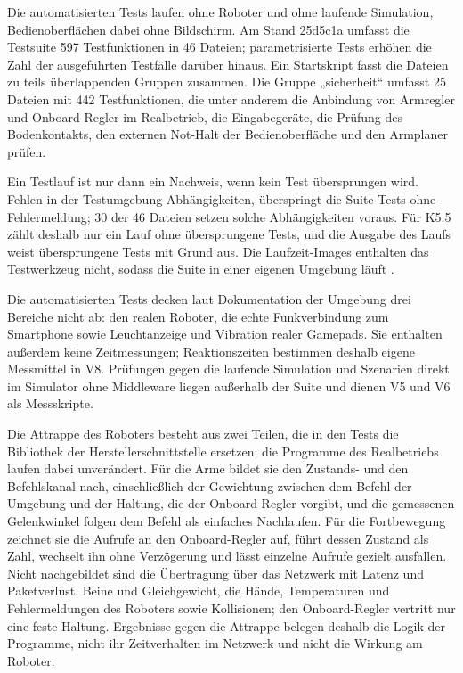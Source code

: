 Die automatisierten Tests laufen ohne Roboter und ohne laufende Simulation, Bedienoberflächen dabei ohne Bildschirm.
Am Stand 25d5c1a umfasst die Testsuite 597 Testfunktionen in 46 Dateien; parametrisierte Tests erhöhen die Zahl der ausgeführten Testfälle darüber hinaus.
Ein Startskript fasst die Dateien zu teils überlappenden Gruppen zusammen.
Die Gruppe „sicherheit“ umfasst 25 Dateien mit 442 Testfunktionen, die unter anderem die Anbindung von Armregler und Onboard-Regler im Realbetrieb, die Eingabegeräte, die Prüfung des Bodenkontakts, den externen Not-Halt der Bedienoberfläche und den Armplaner prüfen.

Ein Testlauf ist nur dann ein Nachweis, wenn kein Test übersprungen wird.
Fehlen in der Testumgebung Abhängigkeiten, überspringt die Suite Tests ohne Fehlermeldung; 30 der 46 Dateien setzen solche Abhängigkeiten voraus.
Für K5.5 zählt deshalb nur ein Lauf ohne übersprungene Tests, und die Ausgabe des Laufs weist übersprungene Tests mit Grund aus.
Die Laufzeit-Images enthalten das Testwerkzeug nicht, sodass die Suite in einer eigenen Umgebung läuft .

Die automatisierten Tests decken laut Dokumentation der Umgebung drei Bereiche nicht ab: den realen Roboter, die echte Funkverbindung zum Smartphone sowie Leuchtanzeige und Vibration realer Gamepads.
Sie enthalten außerdem keine Zeitmessungen; Reaktionszeiten bestimmen deshalb eigene Messmittel in V8.
Prüfungen gegen die laufende Simulation und Szenarien direkt im Simulator ohne Middleware liegen außerhalb der Suite und dienen V5 und V6 als Messskripte.

Die Attrappe des Roboters besteht aus zwei Teilen, die in den Tests die Bibliothek der Herstellerschnittstelle ersetzen; die Programme des Realbetriebs laufen dabei unverändert.
Für die Arme bildet sie den Zustands- und den Befehlskanal nach, einschließlich der Gewichtung zwischen dem Befehl der Umgebung und der Haltung, die der Onboard-Regler vorgibt, und die gemessenen Gelenkwinkel folgen dem Befehl als einfaches Nachlaufen.
Für die Fortbewegung zeichnet sie die Aufrufe an den Onboard-Regler auf, führt dessen Zustand als Zahl, wechselt ihn ohne Verzögerung und lässt einzelne Aufrufe gezielt ausfallen.
Nicht nachgebildet sind die Übertragung über das Netzwerk mit Latenz und Paketverlust, Beine und Gleichgewicht, die Hände, Temperaturen und Fehlermeldungen des Roboters sowie Kollisionen; den Onboard-Regler vertritt nur eine feste Haltung.
Ergebnisse gegen die Attrappe belegen deshalb die Logik der Programme, nicht ihr Zeitverhalten im Netzwerk und nicht die Wirkung am Roboter.

